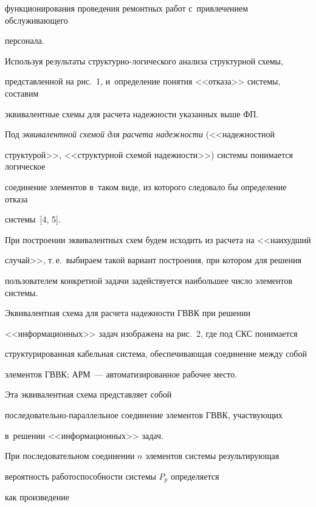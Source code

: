 функционирования проведения ремонтных работ с~привлечением обслуживающего 

персонала. 

      

      Используя результаты структурно-логического анализа структурной схемы, 

представленной на рис.~1, и~определение понятия <<отказа>> системы, составим 

эквивалентные схемы для расчета надежности указанных выше ФП.

      

      Под \textit{эквивалентной схемой для расчета надежности} (<<надежностной 

структурой>>, <<структурной схемой надежности>>) системы понимается логическое 

соединение элементов в~таком виде, из которого следовало бы определение отказа 

системы~[4, 5]. 

      

      При построении эквивалентных схем будем исходить из расчета на <<наихудший 

случай>>, т.\,е.\ выбираем такой вариант построения, при котором для решения 

пользователем конкретной задачи задействуется наибольшее число элементов сис\-темы.

      

      Эквивалентная схема для расчета надежности ГВВК при решении 

<<информационных>> задач изображена на рис.~2, где под СКС понимается 

структурированная кабельная система, обеспечивающая соединение между собой 

элементов ГВВК; АРМ~--- автоматизированное рабочее место. 

      

      Эта эквивалентная схема представляет собой  

по\-сле\-до\-ва\-тель\-но-па\-рал\-лель\-ное соединение элементов ГВВК, участвующих 

в~решении <<информационных>> задач. 

      

      При последовательном соединении $n$ элементов системы результирующая 

вероятность работоспособности системы $P_p$ определяется~\cite{5-zac, 6-zac, 7-zac, 8-zac} 

как произведение 

